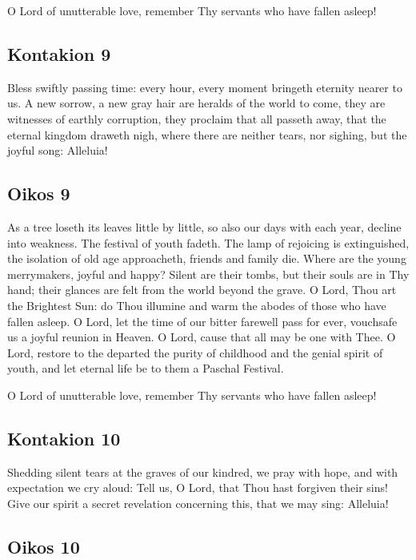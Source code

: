 O Lord of unutterable love, remember Thy servants who have fallen asleep!

\subsection{Kontakion 9}

Bless swiftly passing time: every hour, every moment bringeth eternity nearer to us. A new sorrow, a new gray hair are heralds of the world to come, they are witnesses of earthly corruption, they proclaim that all passeth away, that the eternal kingdom draweth nigh, where there are neither tears, nor sighing, but the joyful song: Alleluia!

\subsection{Oikos 9}

As a tree loseth its leaves little by little, so also our days with each year, decline into weakness. The festival of youth fadeth. The lamp of rejoicing is extinguished, the isolation of old age approacheth, friends and family die. Where are the young merrymakers, joyful and happy? Silent are their tombs, but their souls are in Thy hand; their glances are felt from the world beyond the grave. O Lord, Thou art the Brightest Sun: do Thou illumine and warm the abodes of those who have fallen asleep. O Lord, let the time of our bitter farewell pass for ever, vouchsafe us a joyful reunion in Heaven. O Lord, cause that all may be one with Thee. O Lord, restore to the departed the purity of childhood and the genial spirit of youth, and let eternal life be to them a Paschal Festival.

O Lord of unutterable love, remember Thy servants who have fallen asleep!

\subsection{Kontakion 10}

Shedding silent tears at the graves of our kindred, we pray with hope, and with expectation we cry aloud: Tell us, O Lord, that Thou hast forgiven their sins! Give our spirit a secret revelation concerning this, that we may sing: Alleluia!

\subsection{Oikos 10}


